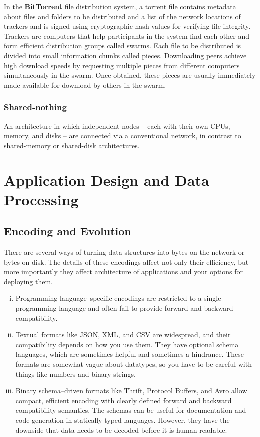 \documentclass{article}
\begin{document}
    In the \textbf{BitTorrent} file distribution system, a torrent file contains metadata about files and folders to be distributed and a list of the network locations of trackers and is signed using cryptographic hash values for verifying file integrity. Trackers are computers that help participants in the system find each other and form efficient distribution groups called swarms. Each file to be distributed is divided into small information chunks called pieces. Downloading peers achieve high download speeds by requesting multiple pieces from different computers simultaneously in the swarm. Once obtained, these pieces are usually immediately made available for download by others in the swarm.
    
    \subsubsection{Shared-nothing}
    An architecture in which independent nodes -- each with their own CPUs, memory, and disks -- are connected via a conventional network, in contrast to shared-memory or shared-disk architectures.
    
\newpage
\section{Application Design and Data Processing}
    \subsection{Encoding and Evolution}
    There are several ways of turning data structures into bytes on the network or bytes on disk. The details of these encodings affect not only their efficiency, but more importantly they affect architecture of applications and your options for deploying them.
    
    \begin{enumerate}[i.]
        \item Programming language–specific encodings are restricted to a single programming language and often fail to provide forward and backward compatibility.
        \item Textual formats like JSON, XML, and CSV are widespread, and their compatibility depends on how you use them. They have optional schema languages, which are sometimes helpful and sometimes a hindrance. These formats are somewhat vague about datatypes, so you have to be careful with things like numbers and  binary strings.
        \item Binary schema–driven formats like Thrift, Protocol Buffers, and Avro allow compact, efficient encoding with clearly defined forward and backward compatibility semantics. The schemas can be useful for documentation and code generation in statically typed languages. However, they have the downside that data   needs to be decoded before it is human-readable.
    \end{enumerate}
    
\end{document}
